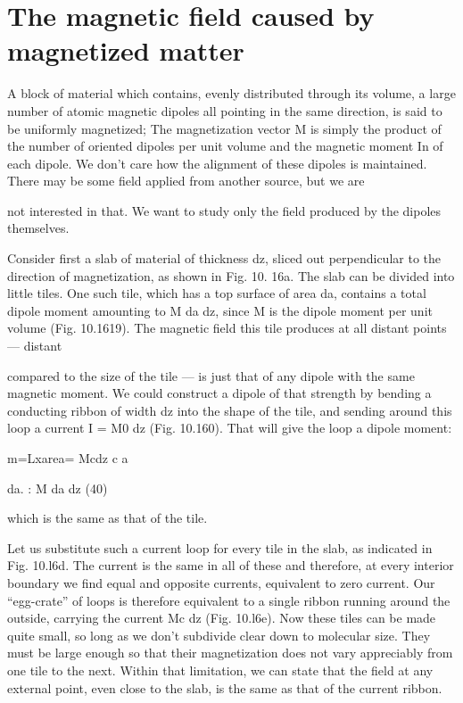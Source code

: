 {\section{The magnetic field caused by magnetized matter}

A block of material which contains, evenly distributed through its
volume, a large number of atomic magnetic dipoles all pointing in
the same direction, is said to be uniformly magnetized; The magnetization
vector M is simply the product of the number of oriented
dipoles per unit volume and the magnetic moment In of each dipole.
We don't care how the alignment of these dipoles is maintained.
There may be some field applied from another source, but we are

not interested in that. We want to study only the field produced
by the dipoles themselves.

Consider first a slab of material of thickness dz, sliced out perpendicular
to the direction of magnetization, as shown in Fig. 10. 16a.
The slab can be divided into little tiles. One such tile, which has a
top surface of area da, contains a total dipole moment amounting to
M da dz, since M is the dipole moment per unit volume (Fig. 10.1619).
The magnetic field this tile produces at all distant points --- distant

 

 

compared to the size of the tile --- is just that of any dipole with the
same magnetic moment. We could construct a dipole of that
strength by bending a conducting ribbon of width dz into the shape
of the tile, and sending around this loop a current I = M0 dz (Fig.
10.160). That will give the loop a dipole moment:

m=Lxarea= Mcdz
c a

da. : M da dz (40)

which is the same as that of the tile.

Let us substitute such a current loop for every tile in the slab, as
indicated in Fig. 10.l6d. The current is the same in all of these and
therefore, at every interior boundary we find equal and opposite
currents, equivalent to zero current. Our ``egg-crate'' of loops is
therefore equivalent to a single ribbon running around the outside,
carrying the current Mc dz (Fig. 10.l6e). Now these tiles can be
made quite small, so long as we don't subdivide clear down to molecular
size. They must be large enough so that their magnetization
does not vary appreciably from one tile to the next. Within that
limitation, we can state that the field at any external point, even close
to the slab, is the same as that of the current ribbon.

}
